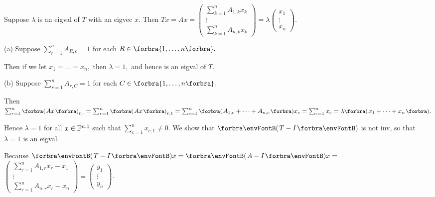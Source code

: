 \documentclass[a4paper, 11pt, UTF8]{article}
\begin{document}
\begin{large}
\vspace{-8pt}\par\quad
Suppose $\lambda$ is an eigval of $T$ with an eigvec $x.$ Then $Tx=Ax={}${\normalsize$\begin{pmatrix} \sum_{k=1}^n A_{1,k}x_k\\ \vdots\\ \sum_{k=1}^n A_{n,k}x_k\end{pmatrix}$}${}=\lambda ${\normalsize$\begin{pmatrix} x_1\\ \vdots\\ x_n\end{pmatrix}$}.\vspace{-6pt}\par\quad
(a) Suppose $\sum_{r=1}^n A_{R,c}=1$ for each $R\in\Bra{1,\dots,n}.$\par\quad\Ha
Then if we let $x_1=\dots=x_n,$ then $\lambda=1,$ and hence is an eigval of $T.$\par\vspace{10pt}\quad
(b) Suppose $\sum_{r=1}^n A_{r,C}=1$ for each $C\in\Bra{1,\dots,n}.$\vspace{4pt}\par\quad\Hb
Then $\sum_{r=1}^n \BigPar{Ax}_{r,\cdot}=\sum_{r=1}^n \BigPar{Ax}_{r,1}=\sum_{c=1}^n\BigPar{A_{1,c}+\dots+A_{n,c}}x_c=\sum_{c=1}^n x_c=\lambda\BigPar{x_1+\dots+x_n}.$\vspace{4pt}\par\quad\Hb
Hence $\lambda=1$ for all $x\in{\mathbb{F}}^{n,1}$ such that $\sum_{c=1}^n x_{c,1}\neq 0.$\PfEnd\vspace{10pt}\quad\Hb
\Or We show that $\Par{T-I}$ is not inv, so that $\lambda=1$ is an eigval.\vspace{2pt}\par\quad\Hb
Because $\Par{T-I}x=\Par{A-I}x={}${\small$\begin{pmatrix} \sum_{r=1}^n A_{1,r}x_r-x_1\\ \vdots\\ \sum_{r=1}^n A_{n,r}x_r-x_n\end{pmatrix}=\begin{pmatrix} y_1\\ \vdots\\ y_n\end{pmatrix}$}.\vspace{4pt}\par\quad\Hb

\end{large}
\end{document}
